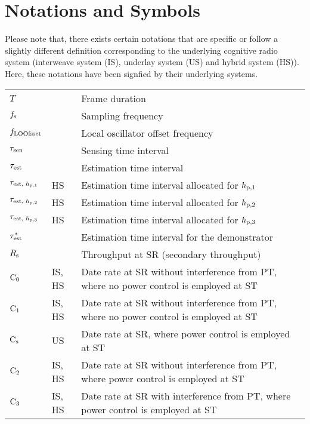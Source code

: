 
\chapter{Notations and Symbols}

Please note that, there exists certain notations that are specific or follow a slightly different definition corresponding to the underlying cognitive radio system (interweave system (IS), underlay system (US) and hybrid system (HS)). Here, these notations have been signfied by their underlying systems.  

\renewcommand{\arraystretch}{1.4}
\begin{longtable}{p{}p{}p{}}

       $T$                     & &             Frame duration \\
       $f_{\text{s}}$                 & &             Sampling frequency \\
       $f_{\text{LOOfsset}}$                  & & 	       Local oscillator offset frequency \\
       $\tau_{\text{sen}}$                 & &             Sensing time interval \\
       $\tau_{\text{est}}$                 & &             Estimation time interval \\      
       $\tau_{\text{est, $h_{\text{p,1}}$}}$                 & HS &             Estimation time interval allocated for $h_{\text{p,1}}$ \\      
       $\tau_{\text{est, $h_{\text{p,2}}$}}$                 & HS &             Estimation time interval allocated for $h_{\text{p,2}}$ \\      
       $\tau_{\text{est, $h_{\text{p,3}}$}}$                 & HS &             Estimation time interval allocated for $h_{\text{p,3}}$ \\      
       ${\tau}^*_{\text{est}}$               & &             Estimation time interval for the demonstrator \\      
       $R_{\text{s}}$                   & &             Throughput at SR (secondary throughput) \\
       $\text{C}_{\text{0}}$                   & IS, HS &      Date rate at SR without interference from PT, where no power control is employed at ST  \\
       $\text{C}_{\text{1}}$                   & IS, HS &      Date rate at SR without interference from PT, where no power control is employed at ST \\ 
       $\text{C}_{\text{s}}$                   & US &          Date rate at SR, where power control is employed at ST \\
       $\text{C}_{\text{2}}$                   & IS, HS &      Date rate at SR without interference from PT, where power control is employed at ST  \\
       $\text{C}_{\text{3}}$                   & IS, HS &      Date rate at SR with interference from PT, where power control is employed at ST  \\ 


\end{longtable}
